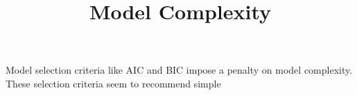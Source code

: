 \documentclass{my-tufte}
\title{Model Complexity}
\begin{document}
\maketitle

Model selection criteria like AIC and BIC impose a penalty on model complexity.
These selection criteria seem to recommend simple
\end{document}
